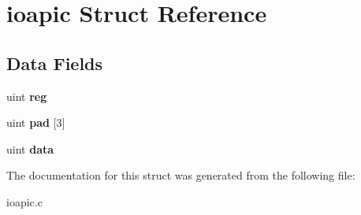 \hypertarget{structioapic}{}\section{ioapic Struct Reference}
\label{structioapic}
\subsection*{Data Fields}
\begin{DoxyCompactItemize}
\item 
uint {\bfseries reg}\hypertarget{structioapic_a84bff406f77801bd1574b9cfb8c23ecf}{}\label{structioapic_a84bff406f77801bd1574b9cfb8c23ecf}

\item 
uint {\bfseries pad} \mbox{[}3\mbox{]}\hypertarget{structioapic_a28ee224d088b53995504eae8cc8fd6ba}{}\label{structioapic_a28ee224d088b53995504eae8cc8fd6ba}

\item 
uint {\bfseries data}\hypertarget{structioapic_a0612c6bb75dc56f0c4c91ad214a02b3a}{}\label{structioapic_a0612c6bb75dc56f0c4c91ad214a02b3a}

\end{DoxyCompactItemize}


The documentation for this struct was generated from the following file\+:\begin{DoxyCompactItemize}
\item 
ioapic.\+c\end{DoxyCompactItemize}
